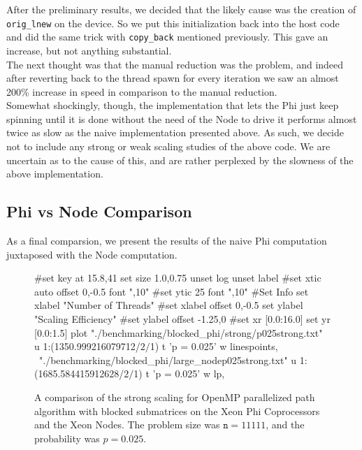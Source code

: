 \documentclass[11pt]{article}
\begin{document}
\noindent After the preliminary results, we decided that the likely cause was the creation of \texttt{orig\_lnew} on the device.  So we put this initialization back into the host code and did the same trick with \texttt{copy\_back} mentioned previously.  This gave an increase, but not anything substantial.\\

\noindent The next thought was that the manual reduction was the problem, and indeed after reverting back to the thread spawn for every iteration we saw an almost 200\% increase in speed in comparison to the manual reduction.\\

\noindent Somewhat shockingly, though, the implementation that lets the Phi just keep spinning until it is done without the need of the Node to drive it performs almost twice as slow as the naive implementation presented above.  As such, we decide not to include any strong or weak scaling studies of the above code.  We are uncertain as to the cause of this, and are rather perplexed by the slowness of the above implementation.

\subsection{Phi vs Node Comparison}

\noindent As a final comparsion, we present the results of the naive Phi computation juxtaposed with the Node computation.

\begin{figure}[h]
	\begin{center}
		\begin{gnuplot}[terminal=cairolatex, terminaloptions= color] 
			#set key at 15.8,41
			set size 1.0,0.75              
			unset log                          
			unset label                          
			#set xtic auto offset 0,-0.5 font ",10"                     
			#set ytic 25 font ",10" 
			#Set Info
			set xlabel "Number of Threads"
			#set xlabel offset 0,-0.5
			set ylabel "Scaling Efficiency"
			#set ylabel offset -1.25,0
			#set xr [0.0:16.0]
			set yr [0.0:1.5]
			plot "./benchmarking/blocked_phi/strong/p025strong.txt" u 1:(1350.999216079712/$2/$1) t 'p = 0.025' w linespoints, \
			"./benchmarking/blocked_phi/large_nodep025strong.txt" u 1:(1685.584415912628/$2/$1) t 'p = 0.025' w lp, \
		\end{gnuplot}
		\caption{A comparison of the strong scaling for OpenMP parallelized path algorithm with blocked submatrices on the Xeon Phi Coprocessors and the Xeon Nodes. The problem size was $\mathtt{n} = 11111$, and the probability was $p = 0.025$.}
		\label{blocked_comparison}
	\end{center}
\end{figure}
\end{document}
